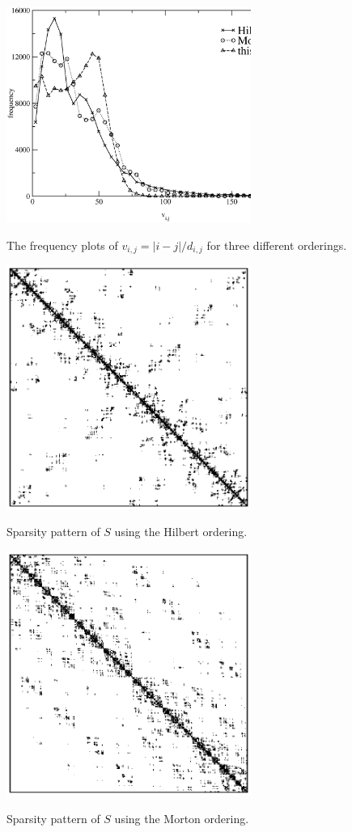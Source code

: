 \documentclass[preprint,showpacs,amssymb,aps]{revtex4}
\begin{document}
\begin{figure}
{\includegraphics[width=8cm]{compare_all.eps}}
\caption{The frequency plots of $v_{i,j} = |i-j|/d_{i,j}$ for
three different orderings.
}
\label{fig:compare_all}
\end{figure} 

\begin{figure}
{\includegraphics[width=8cm]{hilbert_s.eps}}
\caption{Sparsity pattern of $S$ using the Hilbert ordering.
}
\label{fig:hilbert_s}
\end{figure} 

\begin{figure}
{\includegraphics[width=8cm]{morton_s.eps}}
\caption{
Sparsity pattern of $S$ using the Morton ordering.
}
\label{fig:morton_s}
\end{figure} 
\end{document}
